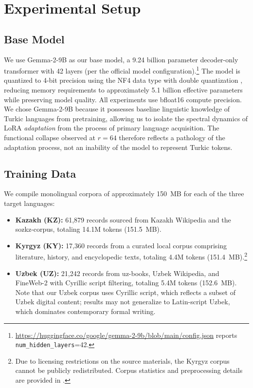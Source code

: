 \documentclass[11pt]{article}
\begin{document}
\section{Experimental Setup}

\subsection{Base Model}

We use Gemma-2-9B \cite{team2024gemma} as our base model, a 9.24 billion parameter decoder-only transformer with 42 layers (per the official model configuration).\footnote{\url{https://huggingface.co/google/gemma-2-9b/blob/main/config.json} reports \texttt{num\_hidden\_layers}=42.} The model is quantized to 4-bit precision using the NF4 data type with double quantization \cite{dettmers2023qlora}, reducing memory requirements to approximately 5.1 billion effective parameters while preserving model quality. All experiments use bfloat16 compute precision. We chose Gemma-2-9B because it possesses baseline linguistic knowledge of Turkic languages from pretraining, allowing us to isolate the spectral dynamics of LoRA \emph{adaptation} from the process of primary language acquisition. The functional collapse observed at $r{=}64$ therefore reflects a pathology of the adaptation process, not an inability of the model to represent Turkic tokens.

\subsection{Training Data}
\label{sec:data}

We compile monolingual corpora of approximately 150~MB for each of the three target languages:

\begin{itemize}
    \item \textbf{Kazakh (KZ):} 61,879 records sourced from Kazakh Wikipedia and the sozkz-corpus, totaling 14.1M tokens (151.5~MB).
    \item \textbf{Kyrgyz (KY):} 17,360 records from a curated local corpus comprising literature, history, and encyclopedic texts, totaling 4.4M tokens (151.4~MB).\footnote{Due to licensing restrictions on the source materials, the Kyrgyz corpus cannot be publicly redistributed. Corpus statistics and preprocessing details are provided in .}
    \item \textbf{Uzbek (UZ):} 21,242 records from uz-books, Uzbek Wikipedia, and FineWeb-2 with Cyrillic script filtering, totaling 5.4M tokens (152.6~MB). Note that our Uzbek corpus uses Cyrillic script, which reflects a subset of Uzbek digital content; results may not generalize to Latin-script Uzbek, which dominates contemporary formal writing.
\end{itemize}
\end{document}
